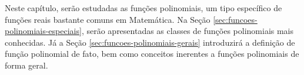 
Neste capítulo, serão estudadas as funções polinomiais, um tipo específico de funções reais bastante 
comuns em Matemática. Na Seção \ref{sec:funcoes-polinomiais-especiais}, serão apresentadas as classes
de funções  polinomiais mais conhecidas. Já a Seção \ref{sec:funcoes-polinomiais-gerais} introduzirá a definição 
de função polinomial de fato, bem como conceitos inerentes a funções polinomiais de forma geral.